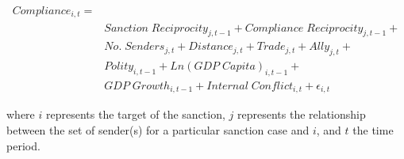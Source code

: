 \begin{align*}
		Compliance_{i,t} =& \\
		&Sanction \; Reciprocity_{j,t-1} + Compliance \; Reciprocity_{j,t-1} + \\
		&No. \; Senders_{j,t} + Distance_{j,t} + Trade_{j,t} + Ally_{j,t} + \\
		&Polity_{i,t-1} + Ln(GDP \; Capita)_{i,t-1} +\\
		&GDP \; Growth_{i,t-1} + Internal \; Conflict_{i,t} + \epsilon_{i,t}
\end{align*}

where $i$ represents the target of the sanction, $j$ represents the relationship between the set of sender(s) for a particular sanction case and $i$, and $t$ the time period.
